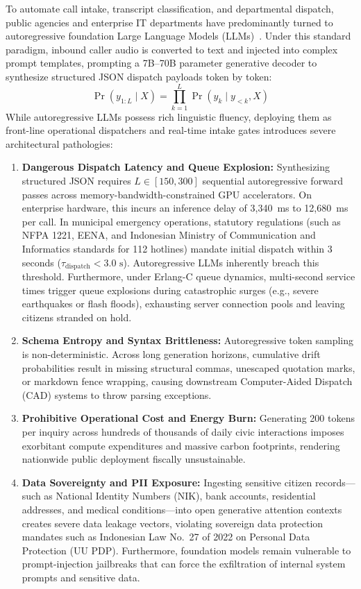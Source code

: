 \documentclass[journal,compsoc]{IEEEtran}
\begin{document}
To automate call intake, transcript classification, and departmental dispatch, public agencies and enterprise IT departments have predominantly turned to autoregressive foundation Large Language Models (LLMs)~\cite{sahabatai2024,qwen2024,gemma2024}. Under this standard paradigm, inbound caller audio is converted to text and injected into complex prompt templates, prompting a 7B--70B parameter generative decoder to synthesize structured JSON dispatch payloads token by token:
\begin{equation}
\Pr(y_{1:L} \mid X) = \prod_{k=1}^{L} \Pr(y_k \mid y_{<k}, X)
\end{equation}
While autoregressive LLMs possess rich linguistic fluency, deploying them as front-line operational dispatchers and real-time intake gates introduces severe architectural pathologies:
\begin{enumerate}
    \item \textbf{Dangerous Dispatch Latency and Queue Explosion:} Synthesizing structured JSON requires $L \in [150, 300]$ sequential autoregressive forward passes across memory-bandwidth-constrained GPU accelerators. On enterprise hardware, this incurs an inference delay of 3,340~ms to 12,680~ms per call. In municipal emergency operations, statutory regulations (such as NFPA 1221, EENA, and Indonesian Ministry of Communication and Informatics standards for 112 hotlines) mandate initial dispatch within 3 seconds ($\tau_{\text{dispatch}} < 3.0 \text{ s}$). Autoregressive LLMs inherently breach this threshold. Furthermore, under Erlang-C queue dynamics, multi-second service times trigger queue explosions during catastrophic surges (e.g., severe earthquakes or flash floods), exhausting server connection pools and leaving citizens stranded on hold.
    \item \textbf{Schema Entropy and Syntax Brittleness:} Autoregressive token sampling is non-deterministic. Across long generation horizons, cumulative drift probabilities result in missing structural commas, unescaped quotation marks, or markdown fence wrapping, causing downstream Computer-Aided Dispatch (CAD) systems to throw parsing exceptions.
    \item \textbf{Prohibitive Operational Cost and Energy Burn:} Generating 200 tokens per inquiry across hundreds of thousands of daily civic interactions imposes exorbitant compute expenditures and massive carbon footprints, rendering nationwide public deployment fiscally unsustainable.
    \item \textbf{Data Sovereignty and PII Exposure:} Ingesting sensitive citizen records—such as National Identity Numbers (NIK), bank accounts, residential addresses, and medical conditions—into open generative attention contexts creates severe data leakage vectors, violating sovereign data protection mandates such as Indonesian Law No.~27 of 2022 on Personal Data Protection (UU PDP). Furthermore, foundation models remain vulnerable to prompt-injection jailbreaks that can force the exfiltration of internal system prompts and sensitive data.
\end{enumerate}
\end{document}
